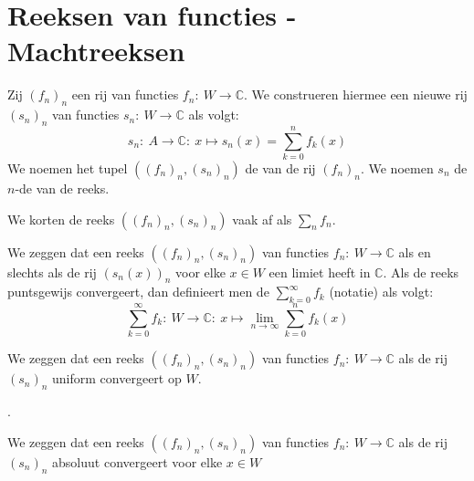 \documentclass[main.tex]{subfiles}
\begin{document}
\section{Reeksen van functies - Machtreeksen}
\label{sec:reeksen-van-functies}

\begin{de}
  Zij $(f_{n})_{n}$ een rij van functies $f_{n}:\ W  \rightarrow \mathbb{C}$.
  We construeren hiermee een nieuwe rij $(s_{n})_{n}$ van functies $s_{n}:\ W \rightarrow \mathbb{C}$ als volgt:
  \[ s_{n}:\ A \rightarrow \mathbb{C}:\ x \mapsto s_{n}(x) = \sum_{k=0}^{n}f_{k}(x) \]
  We noemen het tupel $((f_{n})_{n},(s_{n})_{n})$ de  van de rij $(f_{n})_{n}$.
  We noemen $s_{n}$ de $n$-de  van de reeks.
\end{de}

\begin{de}
  We korten de reeks $((f_{n})_{n},(s_{n})_{n})$ vaak af als $\sum_{n}f_{n}$.
\end{de}

\begin{de}
  We zeggen dat een reeks $((f_{n})_{n},(s_{n})_{n})$ van functies $f_{n}:\ W \rightarrow \mathbb{C}$  als en slechts als de rij $(s_{n}(x))_{n}$ voor elke $x\in W$ een limiet heeft in $\mathbb{C}$.
  Als de reeks puntsgewijs convergeert, dan definieert men de  $\sum_{k=0}^{\infty}f_{k}$ (notatie) als volgt:
  \[ \sum_{k=0}^{\infty}f_{k}:\ W \rightarrow \mathbb{C}:\ x \mapsto \lim_{n \rightarrow \infty}\sum_{k=0}^{n}f_{k}(x) \]
\end{de}

\begin{de}
  We zeggen dat een reeks $((f_{n})_{n},(s_{n})_{n})$ van functies $f_{n}:\ W \rightarrow \mathbb{C}$  als de rij $(s_{n})_{n}$ uniform convergeert op $W$.
\end{de}

.

\begin{de}
  We zeggen dat een reeks $((f_{n})_{n},(s_{n})_{n})$ van functies $f_{n}:\ W \rightarrow \mathbb{C}$  als de rij $(s_{n})_{n}$ absoluut convergeert voor elke $x \in W$
\end{de}
\end{document}
